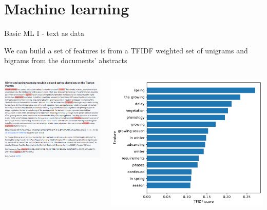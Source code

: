 \documentclass[9pt]{beamer}
\begin{document}
\section{Machine learning}

\begin{frame}{Basic ML I - text as data}

We can build a set of features is from a TFIDF weighted set of unigrams and bigrams from the documents' abstracts

\medskip

\begin{columns}
	\begin{column}{0.5\linewidth}
		\includegraphics[width=\linewidth]{images/doc_example.png}
	\end{column}
	\begin{column}{0.5\linewidth}
		\includegraphics[width=\linewidth]{images/example_doc_tfidf.pdf}
	\end{column}
\end{columns}


\end{frame}
\end{document}
